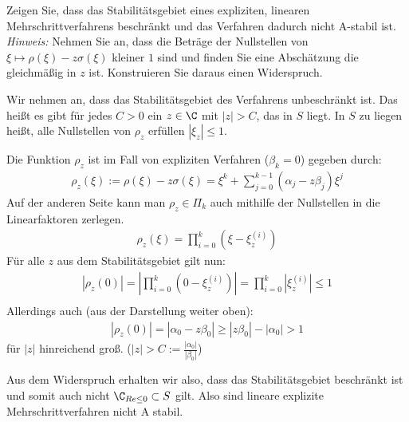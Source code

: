 \begin{exercise}
Zeigen Sie, dass das Stabilitätsgebiet eines expliziten, linearen Mehrschrittverfahrens
beschränkt und das Verfahren dadurch nicht A-stabil ist. \\
\textit{Hinweis:} Nehmen Sie an, dass die Beträge der Nullstellen von $\xi \mapsto \rho(\xi) - z\sigma(\xi)$
kleiner $1$ sind und finden Sie eine Abschätzung die gleichmäßig in $z$ ist.
Konstruieren Sie daraus einen Widerspruch.
\end{exercise}
\begin{solution}
Wir nehmen an, dass das Stabilitätsgebiet des Verfahrens unbeschränkt ist. Das heißt es gibt für jedes $C>0$ ein $z \in \C$ mit $|z|>C$, das in $S$ liegt. In $S$ zu liegen heißt, alle Nullstellen von $\rho_z$ erfüllen $|\xi_z| \leq 1$.

Die Funktion $\rho_z$ ist im Fall von expliziten Verfahren ($\beta_k = 0$) gegeben durch:
\begin{align*}
  \rho_z(\xi) := \rho(\xi) - z \sigma(\xi) = \xi^k + \sum_{j=0}^{k-1} (\alpha_j - z \beta_j) \xi^j
\end{align*}
Auf der anderen Seite kann man $\rho_z \in \Pi_k$ auch mithilfe der Nullstellen in die Linearfaktoren zerlegen.
\begin{align*}
  \rho_z(\xi) = \prod_{i = 0}^k(\xi - \xi_{z}^{(i)})
\end{align*}
Für alle $z$ aus dem Stabilitätsgebiet gilt nun:
\begin{align*}
  |\rho_z(0)| = |\prod_{i = 0}^k(0 - \xi_{z}^{(i)})| = \prod_{i = 0}^k|\xi_{z}^{(i)}| \leq 1 \\
\end{align*}
Allerdings auch (aus der Darstellung weiter oben):
\begin{align*}
  |\rho_z(0)| = |\alpha_0 - z \beta_0| \geq |z \beta_0| - |\alpha_0| > 1
\end{align*}
für $|z|$ hinreichend groß. ($|z| > C := \frac{|\alpha_0|}{|\beta_0|}$)

Aus dem Widerspruch erhalten wir also, dass das Stabilitätsgebiet beschränkt ist und somit auch nicht $\C_{Re \leq 0} \subset S$ gilt. Also sind lineare explizite Mehrschrittverfahren nicht A stabil.
\end{solution}
